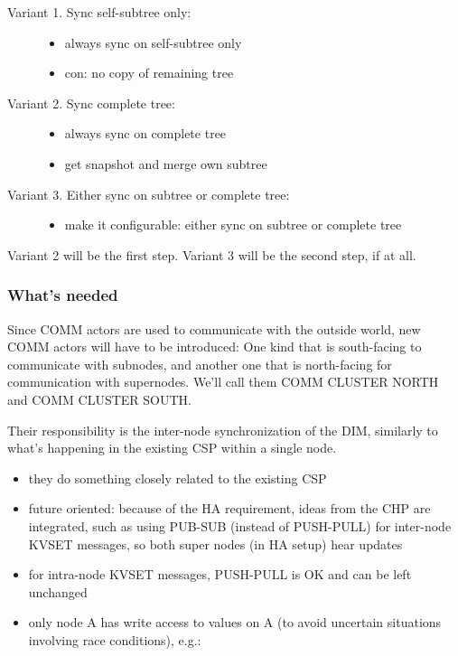 \begin{description}
	\item [Variant 1. Sync self-subtree only:] \hfill
		\begin{itemize}
			\item always sync on self-subtree only
			\item con: no copy of remaining tree
		\end{itemize}

	\item [Variant 2. Sync complete tree:] \hfill
		\begin{itemize}
			\item always sync on complete tree
			\item get snapshot and merge own subtree
		\end{itemize}

	\item [Variant 3. Either sync on subtree or complete tree:] \hfill
		\begin{itemize}
			\item make it configurable: either sync on subtree or complete tree
		\end{itemize}
\end{description}

Variant 2 will be the first step. Variant 3 will be the second step, if at all.


\subsubsection{What's needed}
Since COMM actors are used to communicate with the outside world, new COMM
actors will have to be introduced: One kind that is south-facing to communicate
with subnodes, and another one that is north-facing for communication with
supernodes. We'll call them COMM CLUSTER NORTH and COMM CLUSTER SOUTH.

Their responsibility is the inter-node synchronization of the DIM, similarly to
what's happening in the existing CSP within a single node.

\begin{itemize}
	\item they do something closely related to the existing CSP
	\item future oriented: because of the HA requirement, ideas from the CHP are integrated, such as using PUB-SUB (instead of PUSH-PULL) for inter-node KVSET messages, so both super nodes (in HA setup) hear updates
	\item for intra-node KVSET messages, PUSH-PULL is OK and can be left unchanged
	\item only node A has write access to values on A (to avoid uncertain situations involving race conditions), e.g.:
\end{itemize}

